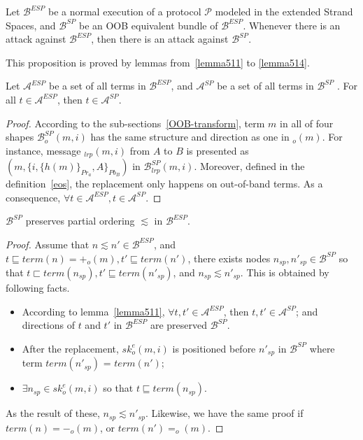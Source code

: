 \begin{Proposition}
Let $\mathcal{B}^{ESP}$ be a normal execution of a protocol $\mathcal{P}$ modeled in the extended Strand Spaces, and $\mathcal{B}^{SP}$ be an OOB equivalent bundle of $\mathcal{B}^{ESP}$. Whenever there is an attack against $\mathcal{B}^{ESP}$, then there is an attack against $\mathcal{B}^{SP}$. 
\end{Proposition}

This proposition is proved by lemmas from~\ref{lemma511} to \ref{lemma514}. 

\begin{Lemma}\label{lemma511}
Let $\mathcal{A}^{ESP}$ be a set of all terms in $\mathcal{B}^{ESP}$, and $\mathcal{A}^{SP}$ be a set of all terms in $\mathcal{B}^{SP}$ . For all $t \in \mathcal{A}^{ESP}$, then $t \in \mathcal{A}^{SP}$. 
\end{Lemma}
\begin{proof}
According to the sub-sections~\ref{OOB-transform}, term $m$ in all of four shapes $\mathcal{B}^{SP}_o(m,i)$ has the same structure and direction as one in $_o(m)$. For instance, message $_{lrp}(m,i)$ from $A$ to $B$ is presented as $(m, \{i,\{h(m)\}_{Pr_a},A\}_{Pb_B})$ in $\mathcal{B}^{SP}_{lrp}(m,i)$. Moreover, defined in the definition~\ref{eos}, the replacement only happens on out-of-band terms. As a consequence, $\forall t \in \mathcal{A}^{ESP}, t \in \mathcal{A}^{SP}$.
\end{proof}

\begin{Lemma}\label{lemma512}
$\mathcal{B}^{SP}$ preserves partial ordering $\lesssim$ in $\mathcal{B}^{ESP}$.    
\end{Lemma}

\begin{proof}
Assume that $n \lesssim n' \in \mathcal{B}^{ESP}$, and $t \sqsubseteq term(n) = +_o(m), t' \sqsubseteq term(n')$,  there exists nodes $n_{sp},n'_{sp} \in \mathcal{B}^{SP}$ so that $t \sqsubset term(n_{sp}), t' \sqsubseteq term(n'_{sp})$, and $n_{sp} \lesssim n'_{sp} $. This is obtained by following facts. 
\begin{itemize}
\item According to lemma~\ref{lemma511}, $\forall t,t' \in \mathcal{A}^{ESP}$, then $t,t' \in \mathcal{A}^{SP}$; and directions of $t$ and $t'$ in $\mathcal{B}^{ESP}$ are preserved $\mathcal{B}^{SP}$.
\item After the replacement, $sk^e_o(m,i)$ is positioned before $n'_{sp}$ in $\mathcal{B}^{SP}$ where term $term(n'_{sp})$ = $term(n')$;
\item $\exists n_{sp} \in sk^e_o(m,i)$ so that $t \sqsubseteq term(n_{sp})$. 
\end{itemize}

As the result of these, $n_{sp} \lesssim n'_{sp}$. Likewise, we have the same proof if $term(n)=-_o(m)$, or $term(n')= _o(m)$.
\end{proof}

